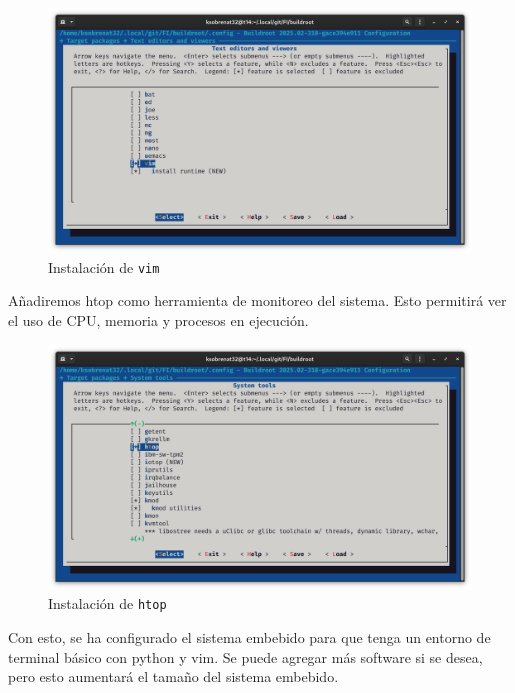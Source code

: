 \documentclass[12pt, letterpaper]{article}
\begin{document}
	\begin{figure}[H]
		\centering
		\begin{center}
			\includegraphics[width=\textwidth]{img/make-menuconfig-04}
			\caption{Instalación de \texttt{vim}}
			\label{fig:make-menuconfig-04}
		\end{center}
	\end{figure}

	Añadiremos htop como herramienta de monitoreo del sistema. Esto permitirá ver el uso de CPU, memoria y procesos en ejecución.

	\begin{figure}[H]
		\centering
		\begin{center}
			\includegraphics[width=\textwidth]{img/make-menuconfig-05}
			\caption{Instalación de \texttt{htop}}
			\label{fig:make-menuconfig-05}
		\end{center}
	\end{figure}

	Con esto, se ha configurado el sistema embebido para que tenga un entorno de terminal básico con python y vim. Se puede agregar más software si se desea, pero esto aumentará el tamaño del sistema embebido.
\end{document}
